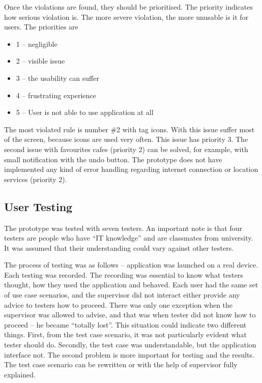 Once the violations are found, they should be prioritised. The priority indicates how serious violation is. The more severe violation, the more unusable is it for users. The priorities are 

\begin{itemize}
    \item 1 -- negligible
    \item 2 -- visible issue
    \item 3 -- the usability can suffer
    \item 4 -- frustrating experience
    \item 5 -- User is not able to use application at all
\end{itemize}

The most violated rule is number \#2 with tag icons. With this issue suffer most of the screen, because icons are used very often.  This issue has priority 3.  The second issue with favourites cafes (priority 2) can be solved, for example, with small notification with the undo button. The prototype does not have implemented any kind of error handling regarding internet connection or location services (priority 2). 

\subsection{User Testing}
The prototype was tested with seven testers. An important note is that four testers are people who have ``IT knowledge'' and are classmates from university. It was assumed that their understanding could vary against other testers.

The process of testing was as follows -- application was launched on a real device. Each testing was recorded. The recording was essential to know what testers thought, how they used the application and behaved. Each user had the same set of use case scenarios, and the supervisor did not interact either provide any advice to testers how to proceed. There was only one exception when the supervisor was allowed to advise, and that was when tester did not know how to proceed -- he became ``totally lost''. This situation could indicate two different things. First, from the test case scenario, it was not particularly evident what tester should do. Secondly, the test case was understandable, but the application interface not. The second problem is more important for testing and the results.  The test case scenario can be rewritten or with the help of supervisor fully explained. 

